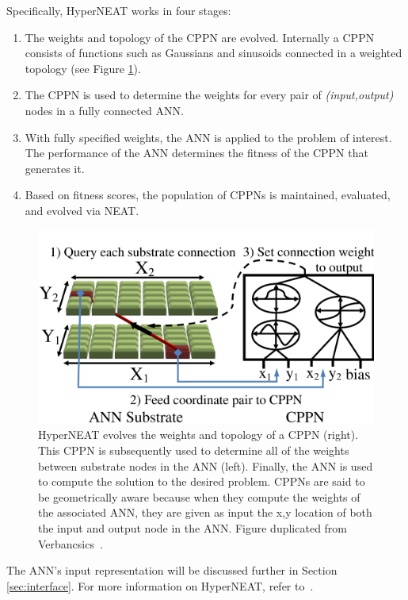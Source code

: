 \documentclass{acm_proc_article-sp}
\begin{document}
Specifically, HyperNEAT works in four stages:

\begin{enumerate}
\item The weights and topology of the CPPN are evolved. Internally a CPPN consists of functions such as Gaussians and sinusoids connected in a weighted topology (see Figure \ref{fig:cppn}).
\item The CPPN is used to determine the weights for every pair of \emph{(input,output)} nodes in a fully connected ANN.
\item With fully specified weights, the ANN is applied to the problem of interest. The performance of the ANN determines the fitness of the CPPN that generates it.
\item Based on fitness scores, the population of CPPNs is maintained, evaluated, and evolved via NEAT.
\end{enumerate}

\begin{figure}[htp]
\begin{center}
\includegraphics[width=\columnwidth]{figures/cppn}
\end{center}
\caption{HyperNEAT evolves the weights and topology of a CPPN (right). This CPPN is subsequently used to determine all of the weights between substrate nodes in the ANN (left). Finally, the ANN is used to compute the solution to the desired problem. CPPNs are said to be geometrically aware because when they compute the weights of the associated ANN, they are given as input the x,y location of both the input and output node in the ANN. Figure duplicated from Verbancsics~\cite{verbancsics10}.}
\label{fig:cppn}
\end{figure}

The ANN's input representation will be discussed further in Section \ref{sec:interface}. For more information on HyperNEAT, refer to~\cite{gauci08}.
\end{document}
